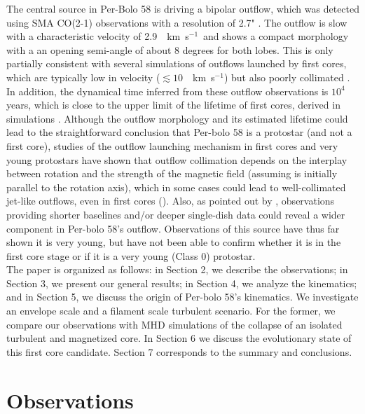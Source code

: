 \documentclass[iop]{emulateapj}
\newcommand{\kms}{\,~km~s$^{-1}$}
\begin{document}
The central source in Per-Bolo 58 is driving a bipolar outflow, which was detected using SMA CO(2-1) observations with a resolution of 2.7" \citep{2011DunhamDetection}. The outflow is slow with a characteristic velocity of 2.9 \kms\ and shows a compact morphology with a an opening semi-angle of about 8 degrees for both lobes. This is only partially consistent with several simulations of outflows launched by first cores, which are typically low in velocity ($\lesssim10$ \kms) but also poorly collimated \citep{2011MatsumotoProtostellar, 2013TomidaRadiation, 2014MachidaProtostellar, 2014BateCollapse,2015TomidaRadiation}. In addition, the dynamical time inferred from these outflow observations is $10^4$ years, which is close to the upper limit of the lifetime of first cores, derived in simulations \citep{2010TomidaExposed}. Although the outflow morphology and its estimated lifetime could lead to the straightforward conclusion that Per-bolo 58 is a protostar (and not a first core), studies of the outflow launching mechanism in first cores and very young protostars have shown that outflow collimation depends on the interplay between rotation and the strength of the magnetic field (assuming is initially parallel to the rotation axis), which in some cases could lead to well-collimated jet-like outflows, even in first cores (\citealt{2002TomisakaCollapse,2012PriceCollimated,2012SeifriedMagnetic}). Also, as pointed out by \cite{2011DunhamDetection}, observations providing shorter baselines and/or deeper single-dish data could reveal a wider component in Per-bolo 58's outflow. Observations of this source have thus far shown it is very young, but have not been able to confirm whether it is in the first core stage or if it is a very young (Class 0) protostar.\\

The paper is organized as follows: in Section 2, we describe the observations; in Section 3, we present our general results; in Section 4, we analyze the kinematics; and in Section 5, we discuss the origin of  Per-bolo 58's kinematics. We investigate an envelope scale and a filament scale turbulent scenario. For the former, we compare our observations with MHD simulations of the collapse of an isolated turbulent and magnetized core. In Section 6 we discuss the evolutionary state of this first core candidate. Section 7 corresponds to the summary and conclusions.


\section{Observations}
\end{document}
